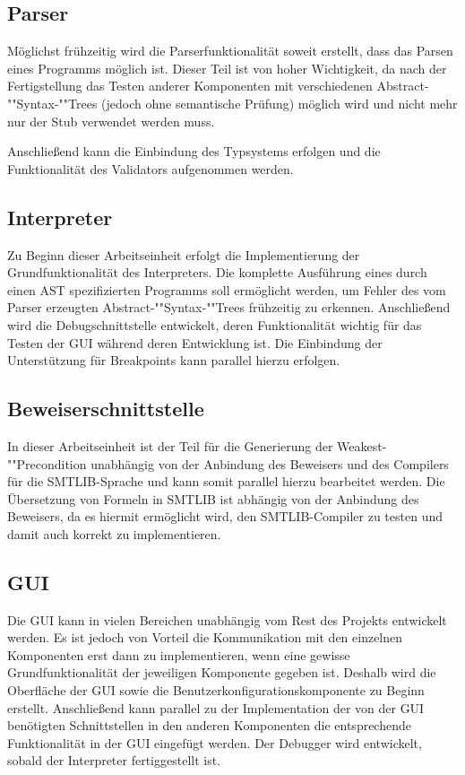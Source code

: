 \subsection{Parser}
Möglichst frühzeitig wird die Parserfunktionalität soweit erstellt, dass das Parsen eines Programms möglich ist. Dieser Teil ist von hoher Wichtigkeit, da nach der Fertigstellung das Testen anderer Komponenten mit verschiedenen Abstract-""Syntax-""Trees (jedoch ohne semantische Prüfung) möglich wird und nicht mehr nur der Stub verwendet werden muss.


Anschließend kann die Einbindung des Typsystems erfolgen und die Funktionalität des Validators aufgenommen werden.

\subsection{Interpreter}
Zu Beginn dieser Arbeitseinheit erfolgt die Implementierung der Grundfunktionalität des Interpreters. Die komplette Ausführung eines durch einen AST spezifizierten Programms soll ermöglicht werden, um Fehler des vom Parser erzeugten Abstract-""Syntax-""Trees frühzeitig zu erkennen. Anschließend wird die Debugschnittstelle entwickelt, deren Funktionalität wichtig für das Testen der GUI während deren Entwicklung ist. Die Einbindung der Unterstützung für Breakpoints kann parallel hierzu erfolgen.

\subsection{Beweiserschnittstelle}
In dieser Arbeitseinheit ist der Teil für die Generierung der Weakest-""Precondition unabhängig von der Anbindung des Beweisers und des Compilers für die SMTLIB-Sprache und kann somit parallel hierzu bearbeitet werden. Die Übersetzung von Formeln in SMTLIB ist abhängig von der Anbindung des Beweisers, da es hiermit ermöglicht wird, den SMTLIB-Compiler zu testen und damit auch korrekt zu implementieren.

\subsection{GUI}
Die GUI kann in vielen Bereichen unabhängig vom Rest des Projekts entwickelt werden. Es ist jedoch von Vorteil die Kommunikation mit den einzelnen Komponenten erst dann zu implementieren, wenn eine gewisse Grundfunktionalität der jeweiligen Komponente gegeben ist. Deshalb wird die Oberfläche der GUI sowie die Benutzerkonfigurationskomponente zu Beginn erstellt. Anschließend kann parallel zu der Implementation der von der GUI benötigten Schnittstellen in den anderen Komponenten die entsprechende Funktionalität in der GUI eingefügt werden. Der Debugger wird entwickelt, sobald der Interpreter fertiggestellt ist.

